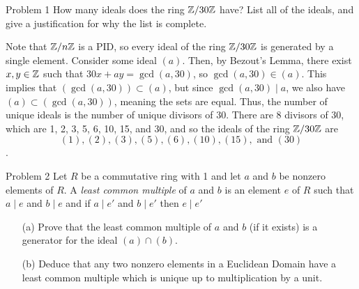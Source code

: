 \documentclass{hmwk}
\begin{document}
\maketitle

\begin{problem}{Problem 1}
How many ideals does the ring $\mathbb{Z}/30\mathbb{Z}$ have? List all of the ideals, and give a justification for why the list is complete.
\end{problem}

\begin{solution}

\pre Note that $\mathbb{Z}/n\mathbb{Z}$ is a PID, so every ideal of the ring $\mathbb{Z}/30\mathbb{Z}$ is generated by a single element. Consider some ideal $(a)$. Then, by Bezout's Lemma, there exist $x, y \in \mathbb{Z}$ such that $30x + ay = \gcd(a, 30)$, so $\gcd(a, 30) \in (a)$. This implies that $(\gcd(a, 30)) \subset (a)$, but since $\gcd(a, 30) \mid a$, we also have $(a) \subset (\gcd(a, 30))$, meaning the sets are equal. Thus, the number of unique ideals is the number of unique divisors of 30. There are 8 divisors of 30, which are 1, 2, 3, 5, 6, 10, 15, and 30, and so the ideals of the ring $\mathbb{Z}/30\mathbb{Z}$ are $$(1), (2), (3), (5), (6), (10), (15), \text{ and }(30)$$.
\end{solution}

\begin{problem}{Problem 2}
Let $R$ be a commutative ring with 1 and let $a$ and $b$ be nonzero elements of $R$. A \textit{least common multiple} of $a$ and $b$ is an element $e$ of $R$ such that $a \mid e$ and $b \mid e$ and if $a\mid e'$ and $b \mid e'$ then $e \mid e'$
\begin{itemize}
    \item[(a)]  Prove that the least common multiple of $a$ and $b$ (if it exists) is a generator for the ideal $(a) \cap (b)$.
    \item[(b)] Deduce that any two nonzero elements in a Euclidean Domain have a least common multiple which is unique up to multiplication by a unit.
\end{itemize}
\end{problem}
\end{document}
